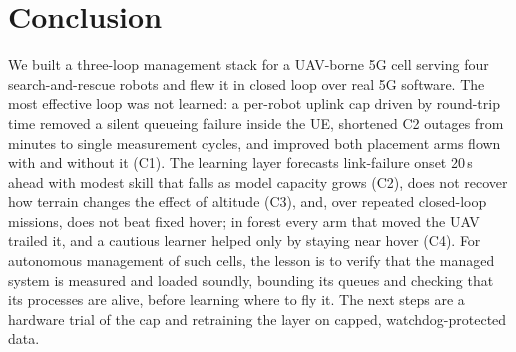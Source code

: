 \section{Conclusion}
\label{sec:conclusion}

We built a three-loop management stack for a UAV-borne 5G cell serving four
search-and-rescue robots and flew it in closed loop over real 5G software. The
most effective loop was not learned: a per-robot uplink cap driven by
round-trip time removed a silent queueing failure inside the UE, shortened C2
outages from minutes to single measurement cycles, and improved both placement
arms flown with and without it (C1). The learning layer forecasts
link-failure onset 20\,s ahead with modest skill that falls as model capacity
grows (C2), does not recover how terrain changes the effect of altitude (C3),
and, over repeated closed-loop missions, does not beat fixed hover; in forest
every arm that moved the UAV trailed it, and a cautious learner helped only by
staying near hover (C4). For autonomous management of such
cells, the lesson is to verify that the managed system is measured and loaded
soundly, bounding its queues and checking that its processes are alive, before
learning where to fly it. The next steps are a hardware trial of the cap and
retraining the layer on capped, watchdog-protected data.
